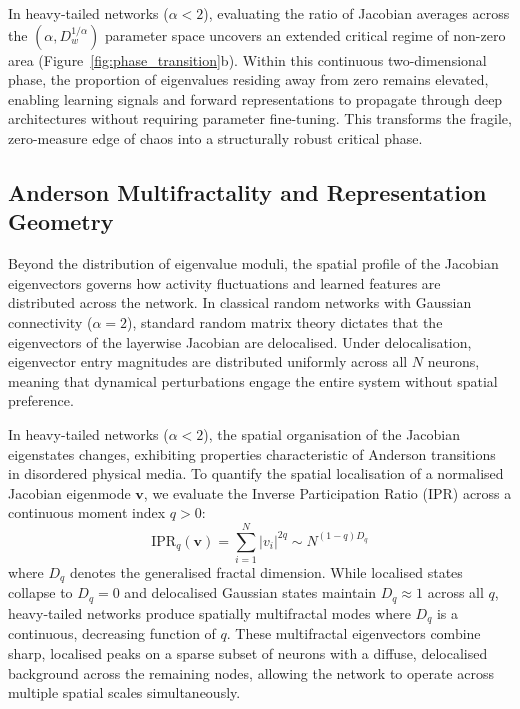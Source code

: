 \documentclass[11pt,oneside]{report}
\begin{document}
In heavy-tailed networks ($\alpha < 2$), evaluating the ratio of Jacobian averages across the $(\alpha, D_w^{1/\alpha})$ parameter space uncovers an extended critical regime of non-zero area (Figure~\ref{fig:phase_transition}b). Within this continuous two-dimensional phase, the proportion of eigenvalues residing away from zero remains elevated, enabling learning signals and forward representations to propagate through deep architectures without requiring parameter fine-tuning. This transforms the fragile, zero-measure edge of chaos into a structurally robust critical phase.

\subsection{Anderson Multifractality and Representation Geometry}
Beyond the distribution of eigenvalue moduli, the spatial profile of the Jacobian eigenvectors governs how activity fluctuations and learned features are distributed across the network. In classical random networks with Gaussian connectivity ($\alpha = 2$), standard random matrix theory dictates that the eigenvectors of the layerwise Jacobian are delocalised. Under delocalisation, eigenvector entry magnitudes are distributed uniformly across all $N$ neurons, meaning that dynamical perturbations engage the entire system without spatial preference. 

In heavy-tailed networks ($\alpha < 2$), the spatial organisation of the Jacobian eigenstates changes, exhibiting properties characteristic of Anderson transitions in disordered physical media. To quantify the spatial localisation of a normalised Jacobian eigenmode $\mathbf{v}$, we evaluate the Inverse Participation Ratio (IPR) across a continuous moment index $q > 0$:
\begin{equation}
	\text{IPR}_q(\mathbf{v}) = \sum_{i=1}^N |v_i|^{2q} \sim N^{(1-q)D_q}
\end{equation}
where $D_q$ denotes the generalised fractal dimension. While localised states collapse to $D_q = 0$ and delocalised Gaussian states maintain $D_q \approx 1$ across all $q$, heavy-tailed networks produce spatially multifractal modes where $D_q$ is a continuous, decreasing function of $q$. These multifractal eigenvectors combine sharp, localised peaks on a sparse subset of neurons with a diffuse, delocalised background across the remaining nodes, allowing the network to operate across multiple spatial scales simultaneously.
\end{document}
